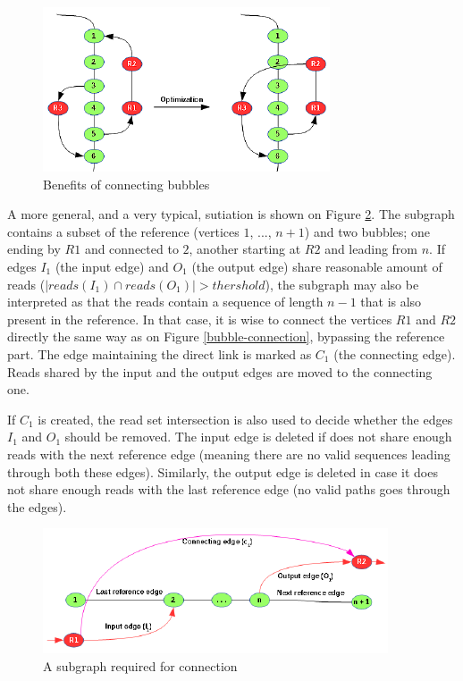 \begin{figure}
	\centering
	\includegraphics{img/bubble-connection.pdf}
	\caption{Benefits of connecting bubbles}
	\label{fig:bubble-connection}
\end{figure}

A more general, and a very typical, sutiation is shown on Figure \ref{fig:connection-general}. The subgraph contains a subset of the reference (vertices $1$, $...$, $n+1$) and two bubbles; one ending by $R1$ and connected to $2$, another starting at $R2$ and leading from $n$. If edges $I_1$ (the input edge) and $O_1$ (the output edge) share reasonable amount of reads ($|reads(I_1) \cap reads(O_1)| > thershold$), the subgraph may also be interpreted as that the reads contain a sequence of length $n-1$ that is also present in the reference. In that case, it is wise to connect the vertices $R1$ and $R2$ directly the same way as on Figure \ref{bubble-connection}, bypassing the reference part. The edge maintaining the direct link is marked as $C_1$ (the connecting edge). Reads shared by the input and the output edges are moved to the connecting one.

If $C_1$ is created, the read set intersection is also used to decide whether the edges $I_1$ and $O_1$ should be removed. The input edge is deleted if does not share enough reads with the next reference edge (meaning there are no valid sequences leading through both these edges). Similarly, the output edge is deleted in case it does not share enough reads with the last reference edge (no valid paths goes through the edges).

\begin{figure}[h]
	\centering
	\includegraphics{img/connection-general.pdf}
	\caption{A subgraph required for connection}
	\label{fig:connection-general}
\end{figure}

